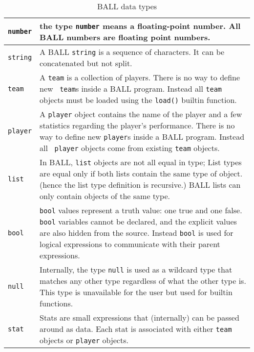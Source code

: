 \begin{table}[htdp]
\begin{center}
\begin{tabular}{l p{4.5in}}
{\tt number} &
the type {\tt number} means a floating-point number. All BALL numbers
are floating point numbers. \\
\hline
{\tt string} &
A BALL {\tt string} is a sequence of characters. It can be
concatenated  but not split. \\
\hline
{\tt team} &
A {\tt team} is a collection of players. There is no way to define new {\tt
  team}s inside a BALL program. Instead all {\tt team} objects must be
loaded using the {\tt load()} builtin function. \\
\hline
{\tt player} & A {\tt player} object contains the name of the player and a
few statistics regarding the player's performance. There is no way to
define new {\tt player}s inside a BALL program. Instead all {\tt
  player} objects come from existing {\tt team} objects. \\
\hline
{\tt list} & In BALL, {\tt list} objects are not all equal in type;
List types are equal only if both lists contain the same type of
object. (hence the list type definition is recursive.) BALL lists
can only contain objects of the same type. \\
\hline
{\tt bool} & {\tt bool} values represent a truth value: one true and
one false. {\tt bool} variables cannot be declared, and the explicit
values are also hidden from the source. Instead {\tt bool} is used for
logical expressions to communicate with their parent expressions. \\
\hline
{\tt null} & Internally, the type {\tt null} is used as a wildcard
type that matches any other type regardless of what the other type
is. This type is unavailable for the user but used for builtin
functions. \\
\hline
{\tt stat} & Stats are small expressions that (internally) can be passed
around as data. Each stat is associated with either {\tt team} objects
or {\tt player} objects. \\

\end{tabular}
\end{center}
\caption{BALL data types}\label{ref_data_types}
\end{table}


